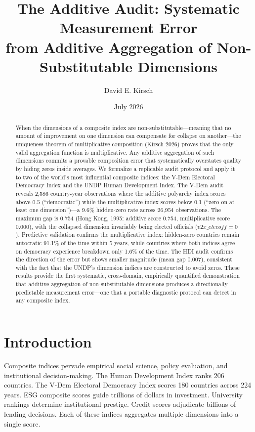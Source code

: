 \documentclass[12pt]{article}
\title{The Additive Audit: Systematic Measurement Error\\from Additive Aggregation of Non-Substitutable Dimensions}
\author{David E. Kirsch}
\date{July 2026}
\begin{document}
\maketitle

\begin{abstract}
When the dimensions of a composite index are non-substitutable---meaning that no amount of improvement on one dimension can compensate for collapse on another---the uniqueness theorem of multiplicative composition (Kirsch 2026) proves that the only valid aggregation function is multiplicative. Any additive aggregation of such dimensions commits a provable composition error that systematically overstates quality by hiding zeros inside averages. We formalize a replicable audit protocol and apply it to two of the world's most influential composite indices: the V-Dem Electoral Democracy Index and the UNDP Human Development Index. The V-Dem audit reveals 2,586 country-year observations where the additive polyarchy index scores above 0.5 (``democratic'') while the multiplicative index scores below 0.1 (``zero on at least one dimension'')---a 9.6\% hidden-zero rate across 26,954 observations. The maximum gap is 0.754 (Hong Kong, 1995: additive score 0.754, multiplicative score 0.000), with the collapsed dimension invariably being elected officials ($v2x\_elecoff = 0$). Predictive validation confirms the multiplicative index: hidden-zero countries remain autocratic 91.1\% of the time within 5 years, while countries where both indices agree on democracy experience breakdown only 1.6\% of the time. The HDI audit confirms the direction of the error but shows smaller magnitude (mean gap 0.007), consistent with the fact that the UNDP's dimension indices are constructed to avoid zeros. These results provide the first systematic, cross-domain, empirically quantified demonstration that additive aggregation of non-substitutable dimensions produces a directionally predictable measurement error---one that a portable diagnostic protocol can detect in any composite index.
\end{abstract}

\section{Introduction}

Composite indices pervade empirical social science, policy evaluation, and institutional decision-making. The Human Development Index ranks 206 countries. The V-Dem Electoral Democracy Index scores 180 countries across 224 years. ESG composite scores guide trillions of dollars in investment. University rankings determine institutional prestige. Credit scores adjudicate billions of lending decisions. Each of these indices aggregates multiple dimensions into a single score.
\end{document}
